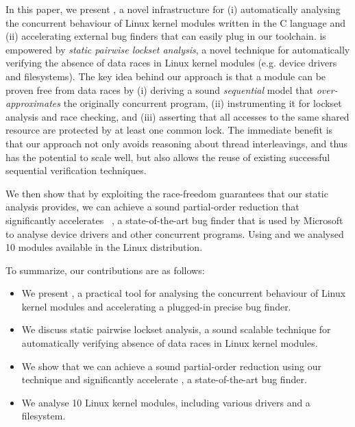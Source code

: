 In this paper, we present \whoop, a novel infrastructure for (i) automatically analysing the concurrent behaviour of Linux kernel modules written in the C language and (ii) accelerating external bug finders that can easily plug in our toolchain. \whoop is empowered by \emph{static pairwise lockset analysis}, a novel technique for automatically verifying the absence of data races in Linux kernel modules (e.g. device drivers and filesystems). The key idea behind our approach is that a module can be proven free from data races by (i) deriving a sound \emph{sequential} model that \emph{over-approximates} the originally concurrent program, (ii) instrumenting it for lockset analysis and race checking, and (iii) asserting that all accesses to the same shared resource are protected by at least one common lock. The immediate benefit is that our approach not only avoids reasoning about thread interleavings, and thus has the potential to scale well, but also allows the reuse of existing successful sequential verification techniques.

We then show that by exploiting the race-freedom guarantees that our static analysis provides, we can achieve a sound partial-order reduction that significantly accelerates \corral~\cite{lal2012solver}, a state-of-the-art bug finder that is used by Microsoft to analyse device drivers and other concurrent programs. Using \whoop and \corral we analysed 10 modules available in the Linux distribution.

To summarize, our contributions are as follows:
\begin{itemize}
\item We present \whoop, a practical tool for analysing the concurrent behaviour of Linux kernel modules and accelerating a plugged-in precise bug finder.
\item We discuss static pairwise lockset analysis,  a sound scalable technique for automatically verifying absence of data races in Linux kernel modules.
\item We show that we can achieve a sound partial-order reduction using our technique and significantly accelerate \corral, a state-of-the-art bug finder.
\item We analyse 10 Linux kernel modules, including various drivers and a filesystem.
\end{itemize}